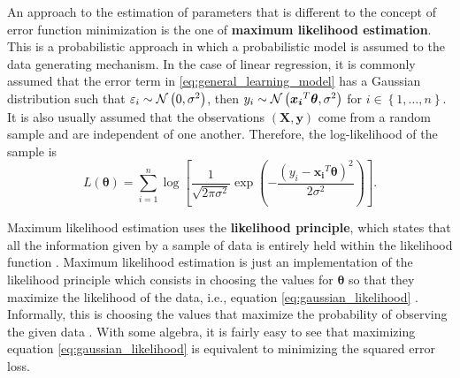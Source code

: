 An approach to the estimation of parameters that is different to the concept of error function minimization is the one of \textbf{maximum likelihood estimation}.
This is a probabilistic approach in which a probabilistic model is assumed to the data generating mechanism. In the case of linear regression, it is commonly assumed that the error term in \eqref{eq:general_learning_model} has a Gaussian distribution such that
$\varepsilon_i \sim \mathcal{N}\left( 0, \sigma^2 \right)$,
then $y_i \sim \mathcal{N}\left( \boldsymbol{x_i}^T \boldsymbol{\theta}, \sigma^2 \right)$ for $i \in \left\{ 1, \ldots, n \right\}$.
It is also usually assumed that the observations $(\boldsymbol{X}, \boldsymbol{y})$ come from a random sample and are independent of one another. Therefore, the log-likelihood of the sample is
\begin{equation}
  \label{eq:gaussian_likelihood}
  L(\boldsymbol{\theta}) = \sum_{i = 1}^n \log \left[ \frac{1}{\sqrt{2 \pi \sigma^2}} \exp \left({- \frac{(y_i - \boldsymbol{x_i}^T \boldsymbol{\theta})^2}{2\sigma^2}}\right) \right].
\end{equation}


Maximum likelihood estimation uses the \textbf{likelihood principle}, which states that all the information given by a sample of data is entirely held within the likelihood function \cite{gelman2013bayesian} \cite{robert2007bayesian}. Maximum likelihood estimation is just an implementation of the likelihood principle which consists in choosing the values for $\boldsymbol{\theta}$ so that they maximize the likelihood of the data, i.e., equation \eqref{eq:gaussian_likelihood} \cite{robert2007bayesian}. Informally, this is choosing the values that maximize the probability of observing the given data \cite[p.~31]{friedman2001elements} \cite{robert2007bayesian}. With some algebra, it is fairly easy to see that maximizing equation \eqref{eq:gaussian_likelihood} is equivalent to minimizing the squared error loss.



